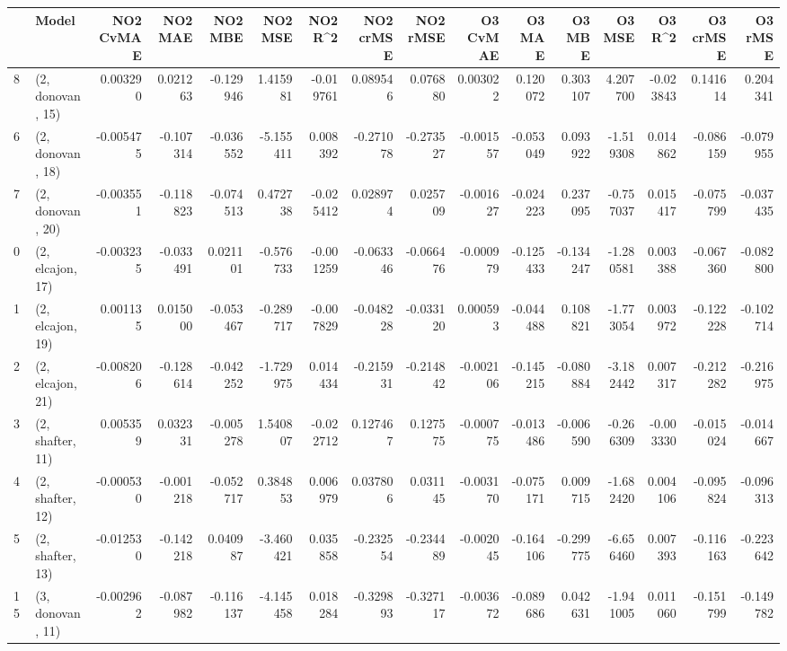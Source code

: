 \begin{tabular}{llrrrrrrrrrrrrrr}
\toprule
{} &             Model &  NO2 CvMAE &   NO2 MAE &   NO2 MBE &    NO2 MSE &   NO2 R\textasciicircum2 &  NO2 crMSE &  NO2 rMSE &  O3 CvMAE &    O3 MAE &    O3 MBE &     O3 MSE &    O3 R\textasciicircum2 &  O3 crMSE &   O3 rMSE \\
\midrule
8  &  (2, donovan, 15) &   0.003290 &  0.021263 & -0.129946 &   1.415981 & -0.019761 &   0.089546 &  0.076880 &  0.003022 &  0.120072 &  0.303107 &   4.207700 & -0.023843 &  0.141614 &  0.204341 \\
6  &  (2, donovan, 18) &  -0.005475 & -0.107314 & -0.036552 &  -5.155411 &  0.008392 &  -0.271078 & -0.273527 & -0.001557 & -0.053049 &  0.093922 &  -1.519308 &  0.014862 & -0.086159 & -0.079955 \\
7  &  (2, donovan, 20) &  -0.003551 & -0.118823 & -0.074513 &   0.472738 & -0.025412 &   0.028974 &  0.025709 & -0.001627 & -0.024223 &  0.237095 &  -0.757037 &  0.015417 & -0.075799 & -0.037435 \\
0  &  (2, elcajon, 17) &  -0.003235 & -0.033491 &  0.021101 &  -0.576733 & -0.001259 &  -0.063346 & -0.066476 & -0.000979 & -0.125433 & -0.134247 &  -1.280581 &  0.003388 & -0.067360 & -0.082800 \\
1  &  (2, elcajon, 19) &   0.001135 &  0.015000 & -0.053467 &  -0.289717 & -0.007829 &  -0.048228 & -0.033120 &  0.000593 & -0.044488 &  0.108821 &  -1.773054 &  0.003972 & -0.122228 & -0.102714 \\
2  &  (2, elcajon, 21) &  -0.008206 & -0.128614 & -0.042252 &  -1.729975 &  0.014434 &  -0.215931 & -0.214842 & -0.002106 & -0.145215 & -0.080884 &  -3.182442 &  0.007317 & -0.212282 & -0.216975 \\
3  &  (2, shafter, 11) &   0.005359 &  0.032331 & -0.005278 &   1.540807 & -0.022712 &   0.127467 &  0.127575 & -0.000775 & -0.013486 & -0.006590 &  -0.266309 & -0.003330 & -0.015024 & -0.014667 \\
4  &  (2, shafter, 12) &  -0.000530 & -0.001218 & -0.052717 &   0.384853 &  0.006979 &   0.037806 &  0.031145 & -0.003170 & -0.075171 &  0.009715 &  -1.682420 &  0.004106 & -0.095824 & -0.096313 \\
5  &  (2, shafter, 13) &  -0.012530 & -0.142218 &  0.040987 &  -3.460421 &  0.035858 &  -0.232554 & -0.234489 & -0.002045 & -0.164106 & -0.299775 &  -6.656460 &  0.007393 & -0.116163 & -0.223642 \\
15 &  (3, donovan, 11) &  -0.002962 & -0.087982 & -0.116137 &  -4.145458 &  0.018284 &  -0.329893 & -0.327117 & -0.003672 & -0.089686 &  0.042631 &  -1.941005 &  0.011060 & -0.151799 & -0.149782 \\

\end{tabular}
